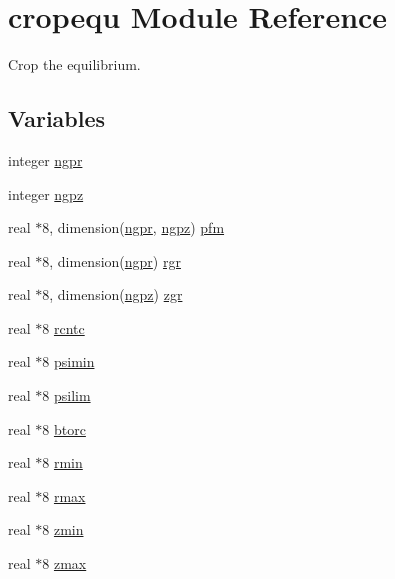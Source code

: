 \hypertarget{namespacecropequ}{
\section{cropequ Module Reference}
\label{namespacecropequ}
}
Crop the equilibrium.  


\subsection*{Variables}
\begin{CompactItemize}
\item 
integer \hyperlink{namespacecropequ_b915d54338bbf1eef691e09d62c5ca74}{ngpr}
\item 
integer \hyperlink{namespacecropequ_5e809f294cb46948b68e7f84c5b3e5e7}{ngpz}
\item 
real $\ast$8, dimension(\hyperlink{namespacecropequ_b915d54338bbf1eef691e09d62c5ca74}{ngpr}, \hyperlink{namespacecropequ_5e809f294cb46948b68e7f84c5b3e5e7}{ngpz}) \hyperlink{namespacecropequ_5473fc74d051d894f0ec5d9f694b5a7c}{pfm}
\item 
real $\ast$8, dimension(\hyperlink{namespacecropequ_b915d54338bbf1eef691e09d62c5ca74}{ngpr}) \hyperlink{namespacecropequ_78c5274a895c892c290855610e3fe6dd}{rgr}
\item 
real $\ast$8, dimension(\hyperlink{namespacecropequ_5e809f294cb46948b68e7f84c5b3e5e7}{ngpz}) \hyperlink{namespacecropequ_ba94b950afefefed82de22487f2e6f95}{zgr}
\item 
real $\ast$8 \hyperlink{namespacecropequ_847b9d7c0a63b3cf6f8c121587f8d128}{rcntc}
\item 
real $\ast$8 \hyperlink{namespacecropequ_226aa64e7824a43774d5758f1cbbfdc3}{psimin}
\item 
real $\ast$8 \hyperlink{namespacecropequ_39bc7b9e1955e30091891c1f2dbbea4d}{psilim}
\item 
real $\ast$8 \hyperlink{namespacecropequ_2fa7545a4a2d563a0df549f2a29ad11f}{btorc}
\item 
real $\ast$8 \hyperlink{namespacecropequ_cf78277c748724ebe92ec8527f5acc26}{rmin}
\item 
real $\ast$8 \hyperlink{namespacecropequ_e0f2d36e258a08a73b6444150b9aac34}{rmax}
\item 
real $\ast$8 \hyperlink{namespacecropequ_9a350ad968e30ba111940f451ea50702}{zmin}
\item 
real $\ast$8 \hyperlink{namespacecropequ_ad2308c1d9ad8704c10ca1a8a65a44c0}{zmax}
\item 

\end{CompactItemize}
